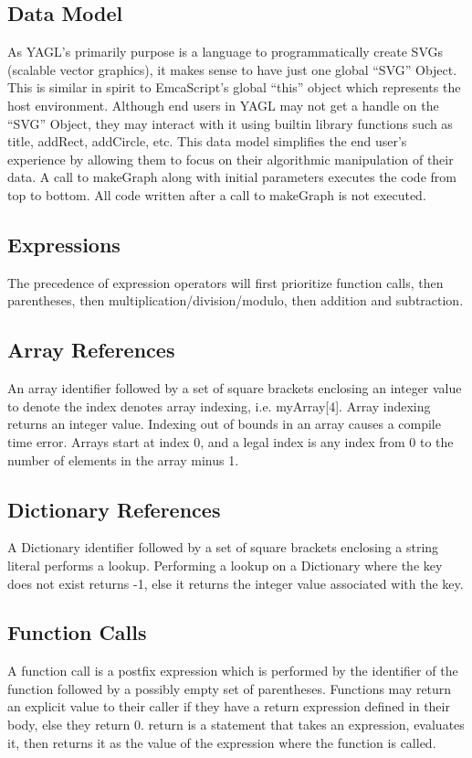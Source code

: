\documentclass[12pt]{article}
\begin{document}
\subsection{Data Model}
As YAGL’s primarily purpose is a language to programmatically create SVGs (scalable vector graphics), it makes sense to have just one global “SVG” Object. This is similar in spirit to EmcaScript’s global “this” object which represents the host environment. Although end users in YAGL may not get a handle  on the “SVG” Object, they may interact with it using builtin library functions such as title, addRect, addCircle, etc. This data model simplifies the end user’s experience by allowing them to focus on their algorithmic manipulation of their data. A call to makeGraph along with initial parameters executes the code from top to bottom. All code written after a call to makeGraph is not executed. 

\subsection{Expressions}
The precedence of expression operators will first prioritize function calls, then parentheses, then multiplication/division/modulo, then addition and subtraction.  

\subsection{Array References}
An array identifier followed by a set of square brackets enclosing an integer value to denote the index denotes array indexing, i.e. myArray[4].  Array indexing returns an integer value.  Indexing out of bounds in an array causes a compile time error.  Arrays start at index 0, and a legal index is any index from 0 to the number of elements in the array minus 1.

\subsection{Dictionary References}
A Dictionary identifier followed by a set of square brackets enclosing a string literal performs a lookup. Performing a lookup on a Dictionary where the key does not exist returns -1, else it returns the integer value associated with the key.

\subsection{Function Calls}
A function call is a postfix expression which is performed by the identifier of the function
followed by a possibly empty set of parentheses. Functions may return an explicit value to their caller if they have a return expression defined in their body, else they return 0.  return is a statement that takes an expression, evaluates it, then returns it as the value of the expression where the function is called.
\end{document}
